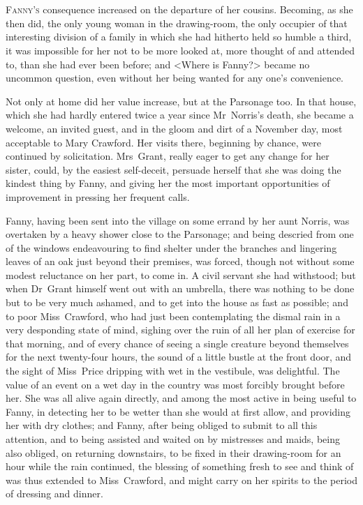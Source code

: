 \chapter[Chapter \thechapter]{} 

 \lettrine[lraise=0.3]{F}{anny's} consequence increased on the departure of her cousins. Becoming, as she then did, the only young woman in the drawing-room, the only occupier of that interesting division of a family in which she had hitherto held so humble a third, it was impossible for her not to be more looked at, more thought of and attended to, than she had ever been before; and <Where is Fanny?> became no uncommon question, even without her being wanted for any one's convenience.

Not only at home did her value increase, but at the Parsonage too. In that house, which she had hardly entered twice a year since Mr~Norris's death, she became a welcome, an invited guest, and in the gloom and dirt of a November day, most acceptable to Mary Crawford. Her visits there, beginning by chance, were continued by solicitation. Mrs~Grant, really eager to get any change for her sister, could, by the easiest self-deceit, persuade herself that she was doing the kindest thing by Fanny, and giving her the most important opportunities of improvement in pressing her frequent calls.

Fanny, having been sent into the village on some errand by her aunt Norris, was overtaken by a heavy shower close to the Parsonage; and being descried from one of the windows endeavouring to find shelter under the branches and lingering leaves of an oak just beyond their premises, was forced, though not without some modest reluctance on her part, to come in. A civil servant she had withstood; but when Dr~Grant himself went out with an umbrella, there was nothing to be done but to be very much ashamed, and to get into the house as fast as possible; and to poor Miss~Crawford, who had just been contemplating the dismal rain in a very desponding state of mind, sighing over the ruin of all her plan of exercise for that morning, and of every chance of seeing a single creature beyond themselves for the next twenty-four hours, the sound of a little bustle at the front door, and the sight of Miss~Price dripping with wet in the vestibule, was delightful. The value of an event on a wet day in the country was most forcibly brought before her. She was all alive again directly, and among the most active in being useful to Fanny, in detecting her to be wetter than she would at first allow, and providing her with dry clothes; and Fanny, after being obliged to submit to all this attention, and to being assisted and waited on by mistresses and maids, being also obliged, on returning downstairs, to be fixed in their drawing-room for an hour while the rain continued, the blessing of something fresh to see and think of was thus extended to Miss~Crawford, and might carry on her spirits to the period of dressing and dinner.

